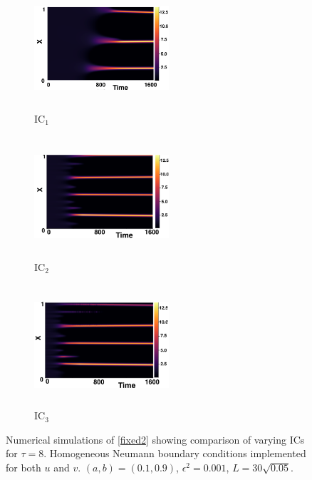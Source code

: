 \begin{figure}[H]
    \centering
    \begin{subfigure}[b]{0.32\textwidth}
        \centering
        \includegraphics[width=5cm,height=4.5cm]{gaff8.png}
        \caption{$\text{IC}_1$}
        \label{}
    \end{subfigure}
    \hfill
    \begin{subfigure}[b]{0.32\textwidth}
        \centering
        \includegraphics[width=5cm,height=4.5cm]{ic28.png}
        \caption{$\text{IC}_2$}
        \label{}
    \end{subfigure}
    \hfill
    \begin{subfigure}[b]{0.32\textwidth}
        \centering
        \includegraphics[width=5cm,height=4.5cm]{ic38.png}
        \caption{$\text{IC}_3$}
        \label{}
    \end{subfigure}
    \caption{Numerical simulations of \eqref{fixed2} showing comparison of varying ICs for $\tau=8$. Homogeneous Neumann boundary conditions implemented for both $u$ and $v$. $(a,b)=(0.1,0.9)$, $\epsilon^2=0.001$, $L=30\sqrt{0.05}$.}
    \label{fig:figtau8}
\end{figure}

